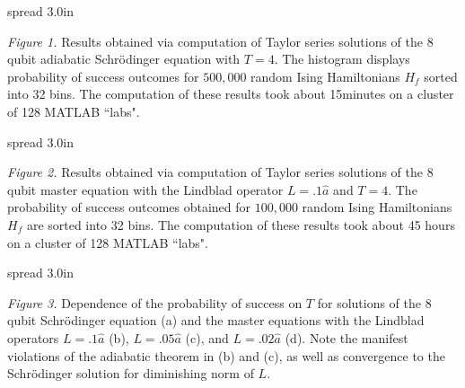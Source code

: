 \documentclass[11 pt]{article}
\begin{document}
\begin{minipage}[t]{0.4\textwidth}
\vbox spread 3.0in{} 

\noindent \emph{Figure 1.} Results obtained via computation of Taylor series solutions of the 8 qubit adiabatic  Schr\"{o}dinger  equation with $T=4$. The histogram displays probability of success outcomes for $500,000$ random Ising Hamiltonians $H_f$ sorted into 32 bins. The computation of these results took about 15minutes on a cluster of 128 MATLAB ``labs".
\end{minipage}
\hspace{1cm}
\begin{minipage}[t]{0.4\textwidth}
\vbox spread 3.0in{} 

\noindent \emph{Figure 2.} Results obtained via computation of Taylor series solutions of the 8 qubit master equation with the Lindblad operator $L=.1 \hat{a}$ and $T=4$. The probability of success outcomes obtained for $100,000$ random Ising Hamiltonians $H_f$ are sorted into 32 bins. The computation of these results took about 45 hours on a cluster of 128 MATLAB ``labs".
\end{minipage}

%

\newpage

\vbox spread 3.0in{} 
\vspace{5cm}

\noindent \emph{Figure 3.} Dependence of the probability of success on $T$ for solutions of the 8 qubit Schr\"{o}dinger equation (a) and the master equations with the Lindblad operators $L=.1 \hat{a}$ (b), $L=.05 \hat{a}$ (c), and $L=.02 \hat{a}$ (d). Note the manifest violations of the adiabatic theorem in (b) and (c), as well as convergence to the Schr\"{o}dinger solution for diminishing norm of $L$.
\end{document}
